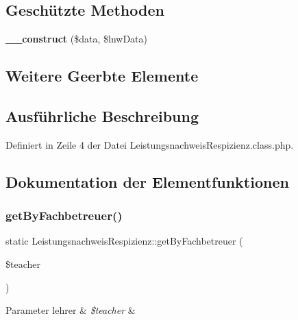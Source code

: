 \subsection*{Geschützte Methoden}
\begin{DoxyCompactItemize}
\item 
\mbox{\label{class_leistungsnachweis_respizienz_ac3396b1d6f3539c45b302c6b3526ce5c}} 
{\bfseries \+\_\+\+\_\+construct} (\$data, \$lnw\+Data)
\end{DoxyCompactItemize}
\subsection*{Weitere Geerbte Elemente}


\subsection{Ausführliche Beschreibung}


Definiert in Zeile 4 der Datei Leistungsnachweis\+Respizienz.\+class.\+php.



\subsection{Dokumentation der Elementfunktionen}
\mbox{\label{class_leistungsnachweis_respizienz_a2de9e2c8bf04a72deeccff17712303a0}} 
\subsubsection{\texorpdfstring{get\+By\+Fachbetreuer()}{getByFachbetreuer()}}
{\footnotesize\ttfamily static Leistungsnachweis\+Respizienz\+::get\+By\+Fachbetreuer (\begin{DoxyParamCaption}\item[{}]{\$teacher }\end{DoxyParamCaption})\hspace{0.3cm}{\ttfamily [static]}}


\begin{DoxyParams}[1]{Parameter}
lehrer & {\em \$teacher} & \\
\hline
\end{DoxyParams}


